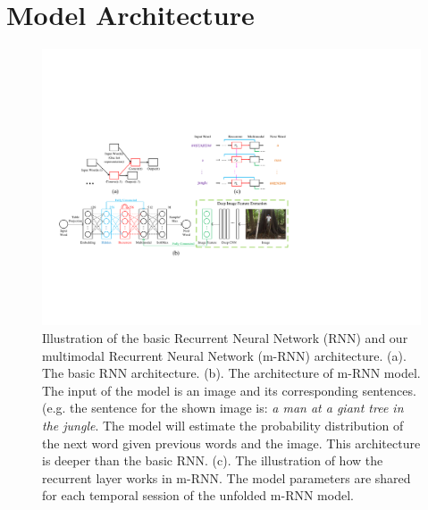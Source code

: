 
\section{Model Architecture}

\begin{figure}[htb]
\begin{center}
\includegraphics[width=0.95\linewidth]{PaperFigures/arch_final_visio.pdf}
\end{center}
   \caption{Illustration of the basic Recurrent Neural Network (RNN) and our multimodal Recurrent Neural Network (m-RNN) architecture.
   (a). The basic RNN architecture. 
   (b). The architecture of m-RNN model.
   The input of the model is an image and its corresponding sentences. (e.g. the sentence for the shown image is: \emph{a man at a giant tree in the jungle}. 
   The model will estimate the probability distribution of the next word given previous words and the image.
   This architecture is deeper than the basic RNN.
   (c). The illustration of how the recurrent layer works in m-RNN. 
   The model parameters are shared for each temporal session of the unfolded m-RNN model.
   }
\label{fig:illu_RNN}
\end{figure}

